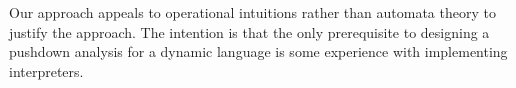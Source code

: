 Our approach appeals to operational intuitions rather than automata theory to justify the approach.
%
The intention is that the only prerequisite to designing a pushdown
analysis for a dynamic language is some experience with implementing
interpreters. %
%
%
